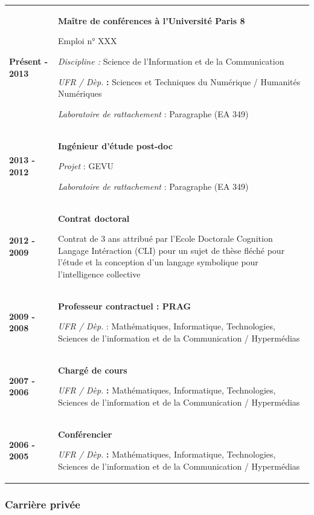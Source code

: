 \documentclass[
  a4paper,
  DIV=11,
  numbers=noendperiod]{scrreprt}
\begin{document}
\begin{longtable}[]{@{}
  >{\raggedright\arraybackslash}p{}
  >{\raggedright\arraybackslash}p{}@{}}
\toprule\noalign{}
\endhead
\bottomrule\noalign{}
\endlastfoot
\textbf{Présent - 2013} & \textbf{Maître de conférences à l'Université
Paris 8}

Emploi n° XXX

\emph{Discipline :} Science de l'Information et de la Communication

\emph{UFR / Dèp.} \textbf{:} Sciences et Techniques du Numérique /
Humanités Numériques

\emph{Laboratoire de rattachement} : Paragraphe (EA 349) \\
\textbf{2013 - 2012} & \textbf{Ingénieur d'étude post-doc}

\emph{Projet} : GEVU

\emph{Laboratoire de rattachement} : Paragraphe (EA 349) \\
\textbf{2012 - 2009} & \textbf{Contrat doctoral}

Contrat de 3 ans attribué par l'Ecole Doctorale Cognition Langage
Intéraction (CLI) pour un sujet de thèse fléché pour l'étude et la
conception d'un langage symbolique pour l'intelligence collective \\
\textbf{2009 - 2008} & \textbf{Professeur contractuel : PRAG}

\emph{UFR / Dèp.} : Mathématiques, Informatique, Technologies, Sciences
de l'information et de la Communication / Hypermédias \\
\textbf{2007 - 2006} & \textbf{Chargé de cours}

\emph{UFR / Dèp.} \textbf{:} Mathématiques, Informatique, Technologies,
Sciences de l'information et de la Communication / Hypermédias \\
\textbf{2006 - 2005} & \textbf{Conférencier}

\emph{UFR / Dèp.} \textbf{:} Mathématiques, Informatique, Technologies,
Sciences de l'information et de la Communication / Hypermédias \\
\end{longtable}

\subsubsection{\texorpdfstring{\textbf{Carrière
privée}}{Carrière privée}}\label{carriuxe8re-privuxe9e-1}
\end{document}
